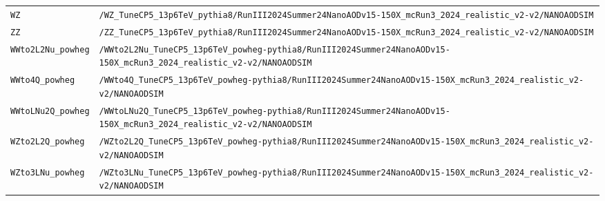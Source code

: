 \begin{longtable}{@{}>{\RaggedRight\arraybackslash}p{} >{\RaggedRight\arraybackslash}p{}@{}}
\addlinespace[2pt]
\texttt{WZ} & \texttt{/\allowbreak{}WZ\_\allowbreak{}TuneCP5\_\allowbreak{}13p6TeV\_\allowbreak{}pythia8/\allowbreak{}RunIII2024Summer24NanoAODv15-\allowbreak{}150X\_\allowbreak{}mcRun3\_\allowbreak{}2024\_\allowbreak{}realistic\_\allowbreak{}v2-\allowbreak{}v2/\allowbreak{}NANOAODSIM} \\
\addlinespace[2pt]
\texttt{ZZ} & \texttt{/\allowbreak{}ZZ\_\allowbreak{}TuneCP5\_\allowbreak{}13p6TeV\_\allowbreak{}pythia8/\allowbreak{}RunIII2024Summer24NanoAODv15-\allowbreak{}150X\_\allowbreak{}mcRun3\_\allowbreak{}2024\_\allowbreak{}realistic\_\allowbreak{}v2-\allowbreak{}v2/\allowbreak{}NANOAODSIM} \\
\addlinespace[2pt]
\texttt{WWto2L2Nu\_\allowbreak{}powheg} & \texttt{/\allowbreak{}WWto2L2Nu\_\allowbreak{}TuneCP5\_\allowbreak{}13p6TeV\_\allowbreak{}powheg-\allowbreak{}pythia8/\allowbreak{}RunIII2024Summer24NanoAODv15-\allowbreak{}150X\_\allowbreak{}mcRun3\_\allowbreak{}2024\_\allowbreak{}realistic\_\allowbreak{}v2-\allowbreak{}v2/\allowbreak{}NANOAODSIM} \\
\addlinespace[2pt]
\texttt{WWto4Q\_\allowbreak{}powheg} & \texttt{/\allowbreak{}WWto4Q\_\allowbreak{}TuneCP5\_\allowbreak{}13p6TeV\_\allowbreak{}powheg-\allowbreak{}pythia8/\allowbreak{}RunIII2024Summer24NanoAODv15-\allowbreak{}150X\_\allowbreak{}mcRun3\_\allowbreak{}2024\_\allowbreak{}realistic\_\allowbreak{}v2-\allowbreak{}v2/\allowbreak{}NANOAODSIM} \\
\addlinespace[2pt]
\texttt{WWtoLNu2Q\_\allowbreak{}powheg} & \texttt{/\allowbreak{}WWtoLNu2Q\_\allowbreak{}TuneCP5\_\allowbreak{}13p6TeV\_\allowbreak{}powheg-\allowbreak{}pythia8/\allowbreak{}RunIII2024Summer24NanoAODv15-\allowbreak{}150X\_\allowbreak{}mcRun3\_\allowbreak{}2024\_\allowbreak{}realistic\_\allowbreak{}v2-\allowbreak{}v2/\allowbreak{}NANOAODSIM} \\
\addlinespace[2pt]
\texttt{WZto2L2Q\_\allowbreak{}powheg} & \texttt{/\allowbreak{}WZto2L2Q\_\allowbreak{}TuneCP5\_\allowbreak{}13p6TeV\_\allowbreak{}powheg-\allowbreak{}pythia8/\allowbreak{}RunIII2024Summer24NanoAODv15-\allowbreak{}150X\_\allowbreak{}mcRun3\_\allowbreak{}2024\_\allowbreak{}realistic\_\allowbreak{}v2-\allowbreak{}v2/\allowbreak{}NANOAODSIM} \\
\addlinespace[2pt]
\texttt{WZto3LNu\_\allowbreak{}powheg} & \texttt{/\allowbreak{}WZto3LNu\_\allowbreak{}TuneCP5\_\allowbreak{}13p6TeV\_\allowbreak{}powheg-\allowbreak{}pythia8/\allowbreak{}RunIII2024Summer24NanoAODv15-\allowbreak{}150X\_\allowbreak{}mcRun3\_\allowbreak{}2024\_\allowbreak{}realistic\_\allowbreak{}v2-\allowbreak{}v2/\allowbreak{}NANOAODSIM} \\

\end{longtable}
